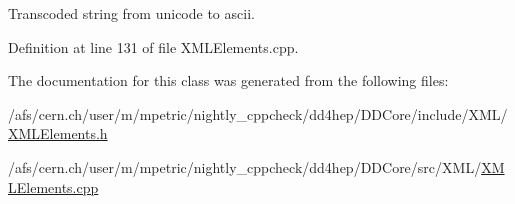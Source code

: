 Transcoded string from unicode to ascii. 



Definition at line 131 of file X\+M\+L\+Elements.\+cpp.



The documentation for this class was generated from the following files\+:\begin{DoxyCompactItemize}
\item 
/afs/cern.\+ch/user/m/mpetric/nightly\+\_\+cppcheck/dd4hep/\+D\+D\+Core/include/\+X\+M\+L/\hyperlink{_x_m_l_elements_8h}{X\+M\+L\+Elements.\+h}\item 
/afs/cern.\+ch/user/m/mpetric/nightly\+\_\+cppcheck/dd4hep/\+D\+D\+Core/src/\+X\+M\+L/\hyperlink{_x_m_l_elements_8cpp}{X\+M\+L\+Elements.\+cpp}\end{DoxyCompactItemize}
